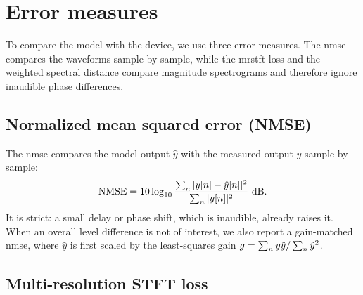 \section{Error measures}
\label{sec:background_error_measures}

To compare the model with the device, we use three error measures. The \gls{nmse} compares the waveforms sample by sample, while the \gls{mrstft} loss and the weighted spectral distance compare magnitude spectrograms and therefore ignore inaudible phase differences.

\subsection{Normalized mean squared error (NMSE)}
\label{subsec:background_nmse}

The \gls{nmse} compares the model output $\hat{y}$ with the measured output $y$ sample by sample:
\begin{equation}
  \mathrm{NMSE} = 10 \log\sb{10} \frac{\sum\sb{n} |y[n] - \hat{y}[n]|^2}{\sum\sb{n} |y[n]|^2}\ \mathrm{dB}.
  \label{eq:nmse}
\end{equation}
It is strict: a small delay or phase shift, which is inaudible, already raises it. When an overall level difference is not of interest, we also report a gain-matched \gls{nmse}, where $\hat{y}$ is first scaled by the least-squares gain $g = \sum\sb{n} y\hat{y} / \sum\sb{n} \hat{y}^2$.

\subsection{Multi-resolution STFT loss}
\label{subsec:background_mrstft}

